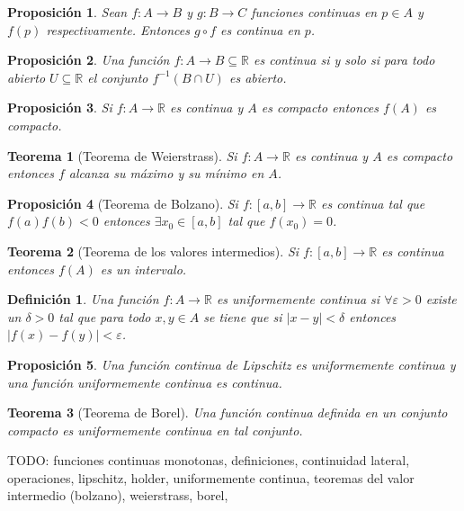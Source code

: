 \documentclass{article}
\newtheorem{theorem}{Teorema}
\newtheorem{prop}{Proposición}
\newtheorem{define}{Definición}
\newcommand{\reales}{\mathbb{R}}
\begin{document}
\begin{prop}
	Sean $f: A \rightarrow B$ y $g: B \rightarrow C$ funciones continuas en $p\in A$ y $f(p)$ respectivamente. Entonces $g \circ f$ es continua en $p$.
\end{prop}

\begin{prop}
	Una función $f: A \rightarrow B \subseteq \reales$ es continua si y solo si para todo abierto $U \subseteq \reales$ el conjunto $f^{-1}(B \cap U)$ es abierto.
\end{prop}

\begin{prop}
	Si $f: A \rightarrow \reales$ es continua y $A$ es compacto entonces $f(A)$ es compacto. 
\end{prop}

\begin{theorem}[Teorema de Weierstrass]
	Si $f: A \rightarrow \reales$ es continua y $A$ es compacto entonces $f$ alcanza su máximo y su mínimo en $A$.
\end{theorem}

\begin{prop}[Teorema de Bolzano]
	Si $f: [a, b] \rightarrow \reales$ es continua tal que $f(a)f(b) < 0$ entonces $\exists x_0 \in [a, b]$ tal que $f(x_0) = 0$.
\end{prop}

\begin{theorem}[Teorema de los valores intermedios]
	Si $f: [a, b] \rightarrow \reales$ es continua entonces $f(A)$ es un intervalo.
\end{theorem}

\begin{define}
	Una función $f: A \rightarrow \reales$ es uniformemente continua si $\forall \varepsilon > 0$ existe un $\delta > 0$ tal que para todo $x,y \in A$ se tiene que si $|x-y| < \delta$ entonces $|f(x) - f(y)| < \varepsilon$.
\end{define}

\begin{prop}
	Una función continua de Lipschitz es uniformemente continua y una función uniformemente continua es continua.
\end{prop}

\begin{theorem}[Teorema de Borel]
	Una función continua definida en un conjunto compacto es uniformemente continua en tal conjunto.
\end{theorem}

TODO: funciones continuas monotonas, definiciones, continuidad lateral, operaciones, lipschitz, holder, uniformemente continua, teoremas del valor intermedio (bolzano), weierstrass, borel, 
\end{document}
